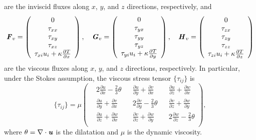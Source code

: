 \documentclass[review]{elsarticle}
\newcommand{\fr}{\frac}
\newcommand{\ka}{\kappa}
\newcommand{\pF}{\textbf{\emph{F}}}
\newcommand{\pG}{\textbf{\emph{G}}}
\newcommand{\pH}{\textbf{\emph{H}}}
\newcommand{\pu}{\textbf{\emph{u}}}
\newcommand{\pat}{\partial}
\newcommand{\na}{\nabla}
\begin{document}
are the inviscid fluxes along $x$, $y$, and $z$ directions, respectively, and
\begin{equation}
  \pF_v = \left( \begin{array}{c} 0 \\ \tau_{xx} \\ \tau_{xy} \\ \tau_{xz} \\ \tau_{xi} u_i +  \ka \fr{\pat T}{\pat x}\\ \end{array} \right), \quad
  \pG_v = \left( \begin{array}{c} 0 \\ \tau_{yx} \\ \tau_{yy} \\ \tau_{yz} \\ \tau_{yi} u_i +  \ka \fr{\pat T}{\pat y}\\ \end{array} \right), \quad
  \pH_v = \left( \begin{array}{c} 0 \\ \tau_{zx} \\ \tau_{zy} \\ \tau_{zz} \\ \tau_{zi} u_i +  \ka \fr{\pat T}{\pat z}\\ \end{array} \right)
\end{equation}
are the viscous fluxes along $x$, $y$, and $z$ directions, respectively. In particular, under the Stokes assumption, the viscous stress tensor $\{ \tau_{ij} \}$ is
\begin{equation}
  \{ \tau_{ij} \} = \mu  \left(
  \begin{split}
   & 2 \fr{\pat u}{\pat x} - \fr{2}{3} \theta & & \fr{\pat u}{\pat y} + \fr{\pat v}{\pat x} & & \fr{\pat u}{\pat z} + \fr{\pat w}{\pat x} \\
  & \fr{\pat u}{\pat y} + \fr{\pat v}{\pat x} & & 2 \fr{\pat v}{\pat y} - \fr{2}{3} \theta & & \fr{\pat v}{\pat z} + \fr{\pat w}{\pat y} \\
  & \fr{\pat u}{\pat z} + \fr{\pat w}{\pat x} & & \fr{\pat v}{\pat z} + \fr{\pat w}{\pat y} & & 2 \fr{\pat w}{\pat z} - \fr{2}{3} \theta \\
  \end{split}
  \right),
\end{equation}
where $\theta = \na \cdot \pu$ is the dilatation and $\mu$ is the dynamic viscosity.
\end{document}
